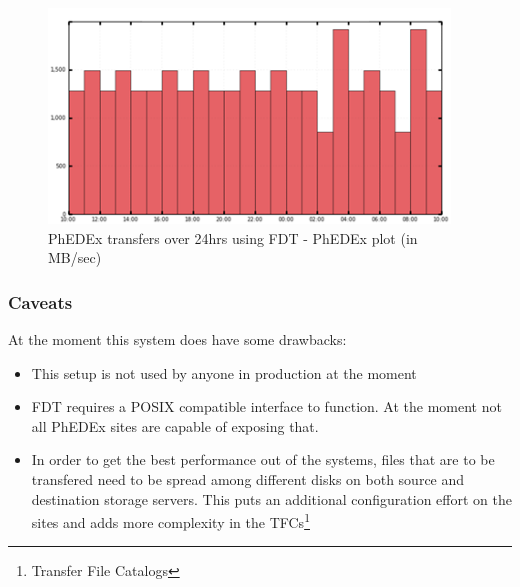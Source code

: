 \begin{figure}[h]
  \centering
  \includegraphics[width=0.95\textwidth]{Figures/FDT-transfers-PhEDEx.png}
  \caption{PhEDEx transfers over 24hrs using FDT - PhEDEx plot (in MB/sec)}
  \label{fig:FDT-Transfers-PhEDEx}
\end{figure} 


\subsubsection{Caveats}

At the moment this system does have some drawbacks:

\begin{itemize}
	\item This setup is not used by anyone in production at the moment
	\item FDT requires a POSIX compatible interface to function. At the moment
not all PhEDEx sites are capable of exposing that.
	\item In order to get the best performance out of the systems, files that
are to be transfered need to be spread among different disks on both source
and destination storage servers. This puts an additional configuration effort
on the sites and adds more complexity in the TFCs\footnote{Transfer File
Catalogs}
\end{itemize}
